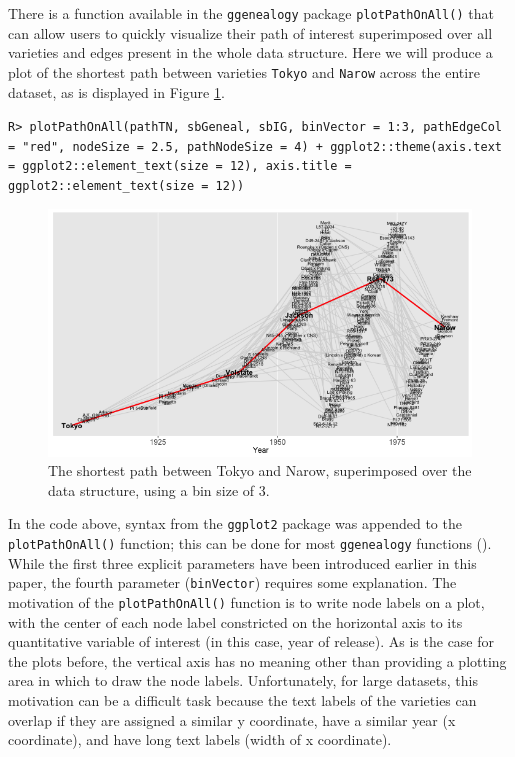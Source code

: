 \documentclass[11pt,a4paper,oldfontcommands,openany]{memoir}
\DeclareRobustCommand{\mybox}[2][gray!15]{%
\begin{tcolorbox}[   %
        breakable,
        left=0pt,
        right=0pt,
        top=0pt,
        bottom=0pt,
        colback=#1,
        colframe=#1,
        width=\dimexpr\textwidth\relax, 
        enlarge left by=0mm,
        boxsep=5pt,
        arc=0pt,outer arc=0pt,
        ]
        #2
\end{tcolorbox}
}
\numberwithin{equation}{section} %
\newcommand{\code}[1]{{\texttt{#1}}}
\newcommand{\pkg}[1]{{\texttt{#1}}}
\begin{document}
There is a function available in the \pkg{ggenealogy} package \code{plotPathOnAll()} that can allow users to quickly visualize their path of interest superimposed over all varieties and edges present in the whole data structure. Here we will produce a plot of the shortest path between varieties \code{Tokyo} and \code{Narow} across the entire dataset, as is displayed in Figure \ref{fig:plotTNBin3}.

\mybox{
\texttt{R> plotPathOnAll(pathTN, sbGeneal, sbIG, binVector = 1:3, pathEdgeCol = "red", nodeSize = 2.5, pathNodeSize = 4) + ggplot2::theme(axis.text = ggplot2::element\_text(size = 12), axis.title = ggplot2::element\_text(size = 12))}
}

\begin{figure}%
    \begin{framed}
    \centering
    \includegraphics[width=\textwidth]{plotTNBin3}
    \end{framed}
    \caption{The shortest path between Tokyo and Narow, superimposed over the data structure, using a bin size of 3.}
    \label{fig:plotTNBin3}
\end{figure}

In the code above, syntax from the \pkg{ggplot2} package was appended to the \code{plotPathOnAll()} function; this can be done for most \pkg{ggenealogy} functions (\citealt{ggplot2}). While the first three explicit parameters have been introduced earlier in this paper, the fourth parameter (\code{binVector}) requires some explanation. The motivation of the \code{plotPathOnAll()} function is to write node labels on a plot, with the center of each node label constricted on the horizontal axis to its quantitative variable of interest (in this case, year of release). As is the case for the plots before, the vertical axis has no meaning other than providing a plotting area in which to draw the node labels. Unfortunately, for large datasets, this motivation can be a difficult task because the text labels of the varieties can overlap if they are assigned a similar y coordinate, have a similar year (x coordinate), and have long text labels (width of x coordinate).
\end{document}
